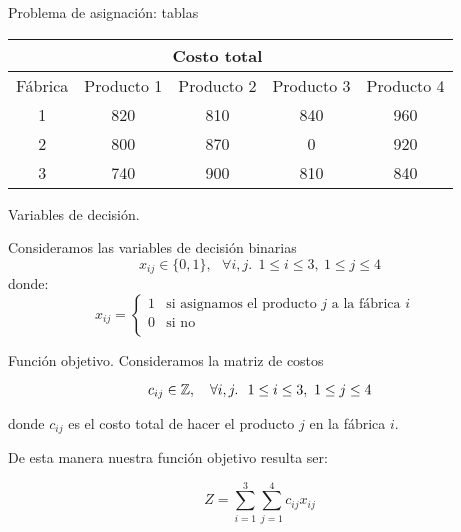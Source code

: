 \documentclass{beamer}
\begin{document}
\begin{frame}[fragile]{Problema de asignación: tablas}
  \begin{center}
    \begin{adjustbox}{width = 1.05 \textwidth}
      \begin{tabular}{|c |c | c | c| c|}
        \hline
        & \multicolumn{3}{|c|}{ Costo total} &   \\
        \hline
        Fábrica & Producto 1 & Producto 2 & Producto 3 & Producto 4 \\
        \hline 
        1 & 820  & 810  & 840  & 960  \\
        2 & 800  & 870  & 0    & 920  \\
        3 & 740  & 900  & 810  & 840  \\
        \hline 
      \end{tabular}
    \end{adjustbox}
  \end{center}
\end{frame}

\begin{frame}[fragile]{Variables de decisión.}
  
  Consideramos las variables de decisión binarias 
  \[
    x_{ij} \in \{0,1\}, \ \ \ \forall i,j. \ \  1 \le i \le 3, \ 1 \le j \le 4
  \]
  donde: 
  \[
  x_{ij} = 
    \begin{cases}
      1 & \text{si asignamos el producto $j$ a la fábrica $i$  } \\
      0 & \text{si no} \\
    \end{cases}
  \]
\end{frame}

\begin{frame}[fragile]{Función objetivo.}
  Consideramos la matriz de costos 

  \[
    c_{ij} \in \Z, \  \ \  \forall i,j. \ \  1 \le i \le 3, \ 1 \le j \le 4
  \]

  donde $c_{ij}$ es el costo total de hacer el producto $j$ en la fábrica $i$.

  \pause 

  \bigskip

  De esta manera nuestra función objetivo resulta ser:

  \[
    Z  = \sum_{i=1}^{3} \sum_{j=1}^{4} c_{ij} x_{ij}
  \]

\end{frame}
\end{document}
